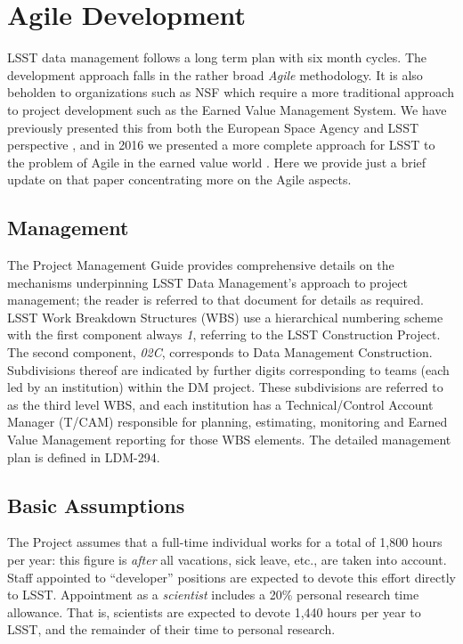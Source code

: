 \section{Agile Development}\label{sec:agile}

LSST data management follows a long term plan with six month cycles. The  development approach falls in the rather broad \emph{Agile} methodology.
It is also beholden to organizations such as NSF which require a more traditional approach to project development such as the Earned Value Management System.
We have previously presented this from both the European Space Agency and LSST perspective \cite{2014SPIE.9150E..1EG}, and in 2016 we presented a more complete approach for LSST to the problem of Agile in the earned value world \cite{2016SPIE.9911E..0NK}.
Here we provide just a brief update on that paper concentrating more on the Agile aspects.


\subsection{Management}
The Project Management Guide \cite{DMTN-020} provides  comprehensive details on the mechanisms underpinning LSST Data Management's approach to project management; the reader is referred to that document for details as required.
LSST Work Breakdown Structures (WBS) use a hierarchical numbering scheme with the first component always \emph{1}, referring to the LSST Construction Project.
The second component, \emph{02C}, corresponds to Data Management Construction.
Subdivisions thereof are indicated by further digits corresponding to teams (each led by an institution) within the DM project.
These subdivisions are referred to as the third level WBS, and each institution has a Technical/Control Account Manager (T/CAM) responsible for planning, estimating, monitoring and Earned Value Management reporting for those WBS elements.
The detailed management plan is defined in LDM-294\cite{LDM-294}.

\subsection{Basic Assumptions}
The Project assumes that a full-time individual works for a total of
1,800 hours per year: this figure is \emph{after} all vacations, sick
leave, etc., are taken into account. Staff appointed to ``developer''
positions are expected to devote this effort directly to LSST.
Appointment as a \emph{scientist} includes a 20\% personal research time
allowance. That is, scientists are expected to devote 1,440 hours per
year to LSST, and the remainder of their time to personal research.

